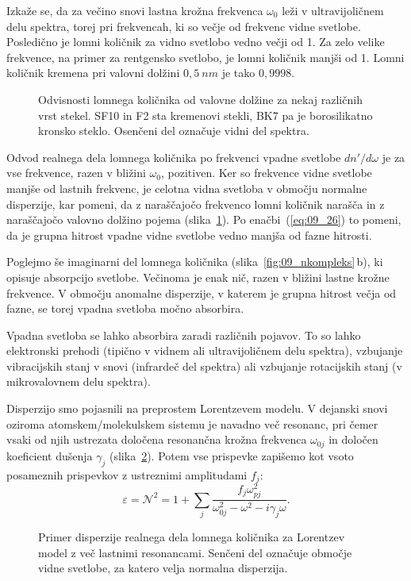 Izkaže se, da za večino snovi lastna krožna frekvenca $\omega_0$
leži v ultravijoličnem delu spektra, torej pri frekvencah, ki so večje od
frekvenc vidne svetlobe. Posledično je lomni količnik za vidno svetlobo 
vedno večji od 1. Za zelo velike frekvence, na primer za rentgensko svetlobo,
je lomni količnik manjši od 1. Lomni količnik kremena pri valovni 
dolžini $0,5~\si{nm}$ je tako $0,9998$. 
\begin{figure}[ht]
\centering
\def\svgwidth{80truemm} 

\caption{Odvisnosti lomnega količnika od valovne dolžine za nekaj različnih vrst stekel. SF10
 in F2 sta kremenovi stekli, BK7 pa je borosilikatno kronsko steklo. Osenčeni 
 del označuje vidni del spektra.}
\label{fig:09_stekla}
\end{figure}

Odvod realnega dela lomnega količnika po frekvenci vpadne svetlobe $dn'/d\omega$
je za vse frekvence, razen v bližini $\omega_0$, pozitiven. 
Ker so frekvence vidne svetlobe manjše od lastnih frekvenc, je celotna
vidna svetloba v območju normalne disperzije, kar pomeni, da z naraščajočo
frekvenco lomni količnik narašča in z naraščajočo valovno dolžino pojema (slika~\ref{fig:09_stekla}). 
Po enačbi~(\ref{eq:09_26}) to pomeni, da je grupna hitrost vpadne vidne 
svetlobe vedno manjša od fazne hitrosti. 

Poglejmo še imaginarni del lomnega količnika (slika~\ref{fig:09_nkompleks}\,b), ki 
opisuje absorpcijo svetlobe. Večinoma je enak nič, razen v bližini lastne krožne frekvence. 
V območju anomalne disperzije, v katerem je grupna hitrost večja od fazne, se 
torej vpadna svetloba močno absorbira. 

\begin{remark}
Vpadna svetloba se lahko absorbira zaradi različnih pojavov. To so lahko 
elektronski prehodi (tipično v vidnem ali ultravijoličnem delu spektra), 
vzbujanje vibracijskih stanj v snovi (infrardeč del spektra) ali 
vzbujanje rotacijskih stanj (v mikrovalovnem delu spektra).
\end{remark}

Disperzijo smo pojasnili na preprostem Lorentzevem modelu.
V dejanski snovi oziroma atomskem/molekulskem sistemu je navadno več resonanc, pri čemer
vsaki od njih ustrezata določena resonančna krožna frekvenca $\omega_{0j}$ in določen koeficient
dušenja $\gamma_j$ (slika~\ref{fig:09_disp_multi}). 
Potem vse prispevke zapišemo kot vsoto posameznih prispevkov 
z ustreznimi amplitudami $f_j$:
\begin{equation}
\varepsilon = \mathcal{N}^2 = 1+ \sum_j \frac{f_j \omega_{pj}^2}{\omega_{0j}^2 - \omega^2 - i\gamma_j\omega}.
\label{eq:09_27}
\end{equation}
\begin{figure}[ht!]
\centering
\def\svgwidth{140truemm} 

\caption{Primer disperzije realnega dela lomnega količnika za Lorentzev model 
z več lastnimi resonancami. Senčeni del označuje območje vidne svetlobe, 
za katero velja normalna disperzija.}
\label{fig:09_disp_multi}
\end{figure}

